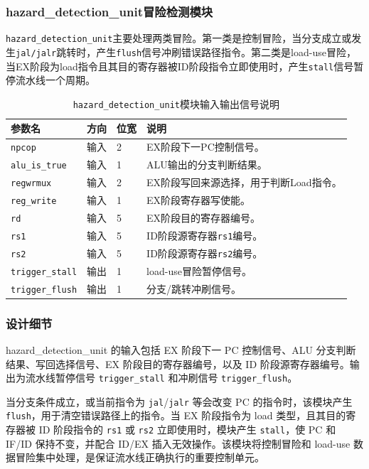 \documentclass[12pt,a4paper]{ctexart}
\newcommand{\code}[1]{\texttt{#1}}
\begin{document}
\subsubsection{hazard\_detection\_unit冒险检测模块}

\code{hazard\_detection\_unit}主要处理两类冒险。第一类是控制冒险，当分支成立或发生\code{jal/jalr}跳转时，产生\code{flush}信号冲刷错误路径指令。第二类是load-use冒险，当EX阶段为load指令且其目的寄存器被ID阶段指令立即使用时，产生\code{stall}信号暂停流水线一个周期。

\begin{table}[H]
\centering
\caption{\code{hazard\_detection\_unit}模块输入输出信号说明}
\footnotesize
\renewcommand{\arraystretch}{1.15}
\begin{tabularx}{\textwidth}{p{3.2cm}p{1.5cm}p{2.1cm}X}
\toprule
参数名 & 方向 & 位宽 & 说明 \\
\midrule
\code{npcop} & 输入 & 2 & EX阶段下一PC控制信号。 \\
\code{alu\_is\_true} & 输入 & 1 & ALU输出的分支判断结果。 \\
\code{regwrmux} & 输入 & 2 & EX阶段写回来源选择，用于判断Load指令。 \\
\code{reg\_write} & 输入 & 1 & EX阶段寄存器写使能。 \\
\code{rd} & 输入 & 5 & EX阶段目的寄存器编号。 \\
\code{rs1} & 输入 & 5 & ID阶段源寄存器\code{rs1}编号。 \\
\code{rs2} & 输入 & 5 & ID阶段源寄存器\code{rs2}编号。 \\
\code{trigger\_stall} & 输出 & 1 & load-use冒险暂停信号。 \\
\code{trigger\_flush} & 输出 & 1 & 分支/跳转冲刷信号。 \\
\bottomrule
\end{tabularx}
\end{table}

\subsubsection*{设计细节}

hazard\_detection\_unit 的输入包括 EX 阶段下一 PC 控制信号、ALU 分支判断结果、写回选择信号、EX 阶段目的寄存器编号，以及 ID 阶段源寄存器编号。输出为流水线暂停信号 \code{trigger\_stall} 和冲刷信号 \code{trigger\_flush}。

当分支条件成立，或当前指令为 \code{jal}/\code{jalr} 等会改变 PC 的指令时，该模块产生 \code{flush}，用于清空错误路径上的指令。当 EX 阶段指令为 load 类型，且其目的寄存器被 ID 阶段指令的 \code{rs1} 或 \code{rs2} 立即使用时，模块产生 \code{stall}，使 PC 和 IF/ID 保持不变，并配合 ID/EX 插入无效操作。该模块将控制冒险和 load-use 数据冒险集中处理，是保证流水线正确执行的重要控制单元。
\end{document}
